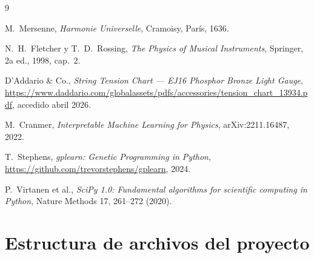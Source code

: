 \documentclass[12pt,a4paper]{article}
\begin{document}
\begin{thebibliography}{9}

  M.\ Mersenne,
  \textit{Harmonie Universelle},
  Cramoisy, París, 1636.

  N.\ H.\ Fletcher y T.\ D.\ Rossing,
  \textit{The Physics of Musical Instruments},
  Springer, 2a ed., 1998, cap.\ 2.

  D'Addario \& Co.,
  \textit{String Tension Chart — EJ16 Phosphor Bronze Light Gauge},
  \url{https://www.daddario.com/globalassets/pdfs/accessories/tension_chart_13934.pdf},
  accedido abril 2026.

  M.\ Cranmer,
  \textit{Interpretable Machine Learning for Physics},
  arXiv:2211.16487, 2022.

  T.\ Stephens,
  \textit{gplearn: Genetic Programming in Python},
  \url{https://github.com/trevorstephens/gplearn}, 2024.

  P.\ Virtanen et al.,
  \textit{SciPy 1.0: Fundamental algorithms for scientific computing in Python},
  Nature Methods 17, 261--272 (2020).

\end{thebibliography}

\appendix

\section{Estructura de archivos del proyecto}
\label{app:archivos}
\end{document}
